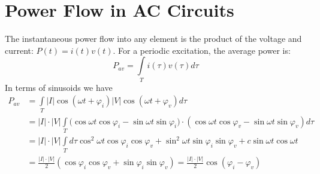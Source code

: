 \section{Power Flow in AC Circuits}
 The instantaneous power flow into any element is the product of the voltage and current: $P(t) = i(t)v(t)$.  For a periodic excitation, the average power is:
    \begin{equation} 
        {P_{av}} = \int\limits_T {i(\tau )v(\tau )d\tau } 
    \end{equation}
In terms of sinusoids we have
    \begin{align*}
        {P_{av}} &= \int\limits_T {\left| I \right|\cos (\omega t + {\varphi _i})\left| V \right|\cos (\omega t + {\varphi _v})d\tau }\\
        &= \left| I \right| \cdot \left| V \right|\int\limits_T {(\cos \omega t\cos {\varphi _i} - \sin \omega t\sin {\varphi _i}} ) \cdot (\cos \omega t\cos {\varphi _v} - \sin \omega t\sin {\varphi _v})d\tau\\
        &= \left| I \right| \cdot \left| V \right|\int\limits_T {d\tau {{\cos }^2}\omega t\cos {\varphi _i}\cos {\varphi _v} + {{\sin }^2}\omega t\sin {\varphi _i}\sin {\varphi _v} + c\sin \omega t\cos \omega t}\\
        &= \frac{{\left| I \right| \cdot \left| V \right|}}{2}(\cos {\varphi _i}\cos {\varphi _v} + \sin {\varphi _i}\sin {\varphi _v}) = \frac{{\left| I \right| \cdot \left| V \right|}}{2}\cos ({\varphi _i} - {\varphi _v})
    \end{align*}
